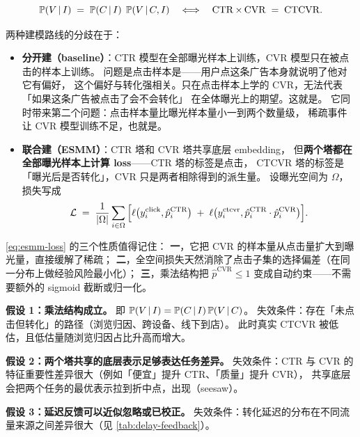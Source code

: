 \begin{equation}
\operatorname{\mathbb{P}}(V \,\vert\, I) \;=\; \operatorname{\mathbb{P}}(C \,\vert\, I)\;\operatorname{\mathbb{P}}(V \,\vert\, C, I)
\quad\Longleftrightarrow\quad
\operatorname{CTR} \times \operatorname{CVR} \;=\; \mathrm{CTCVR} .
\label{eq:ctcvr}
\end{equation}

两种建模路线的分歧在于：

\begin{itemize}
  \item \textbf{分开建（baseline）}：CTR 模型在全部曝光样本上训练，CVR 模型只在被点击的样本上训练。
        问题是点击样本是——用户点这条广告本身就说明了他对它有偏好，
        这个偏好与转化强相关。只在点击样本上学的 CVR，无法代表「如果这条广告被点击了会不会转化」
        在全体曝光上的期望。这就是。
        它同时带来第二个问题：点击样本量比曝光样本量小一到两个数量级，
        稀疏事件让 CVR 模型训练不足，也就是。
  \item \textbf{联合建（ESMM）}：CTR 塔和 CVR 塔共享底层 embedding，
        但\textbf{两个塔都在全部曝光样本上计算 loss}——CTR 塔的标签是点击，
        CTCVR 塔的标签是「曝光后是否转化」，CVR 只是两者相除得到的派生量。
        设曝光空间为 $\Omega$，损失写成
        \begin{equation}
        \mathcal{L} \;=\; \frac{1}{\left\lvert \Omega \right\rvert}\sum_{i \in \Omega}
        \Big[ \ell\big(y_i^{\text{click}}, \hat{p}^{\text{CTR}}_i\big)
        \;+\; \ell\big(y_i^{\text{ctcvr}}, \hat{p}^{\text{CTR}}_i \cdot \hat{p}^{\text{CVR}}_i\big) \Big].
        \label{eq:esmm-loss}
        \end{equation}
\end{itemize}

\eqref{eq:esmm-loss} 的三个性质值得记住：
\textbf{一}，它把 CVR 的样本量从点击量扩大到曝光量，直接缓解了稀疏；
\textbf{二}，全空间损失天然消除了点击子集的选择偏差（在同一分布上做经验风险最小化）；
\textbf{三}，乘法结构把 $\hat{p}^{\text{CVR}} \le 1$ 变成自动约束——不需要额外的 sigmoid 截断或归一化。

\begin{formulacard}
\textbf{假设 1：乘法结构成立。} 即 $\operatorname{\mathbb{P}}(V \,\vert\, I) = \operatorname{\mathbb{P}}(C \,\vert\, I)\operatorname{\mathbb{P}}(V \,\vert\, C)$。
失效条件：存在「未点击但转化」的路径（浏览归因、跨设备、线下到店）。
此时真实 CTCVR 被低估，且低估量随浏览归因占比升高而增大。

\textbf{假设 2：两个塔共享的底层表示足够表达任务差异。}
失效条件：CTR 与 CVR 的特征重要性差异很大（例如「便宜」提升 CTR、「质量」提升 CVR），
共享底层会把两个任务的最优表示拉到折中点，出现（seesaw）。

\textbf{假设 3：延迟反馈可以近似忽略或已校正。}
失效条件：转化延迟的分布在不同流量来源之间差异很大（见 \cref{tab:delay-feedback}）。
\end{formulacard}

